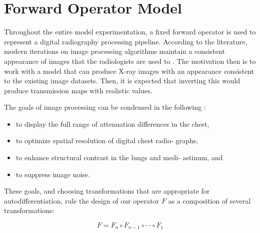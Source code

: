 \documentclass[nomenclature, english, bibtex]{kththesis}
\numberwithin{listing}{chapter}
\begin{document}
\section{Forward Operator Model}

Throughout the entire model experimentation, a fixed forward operator is used to represent a
digital radiography processing pipeline. According to the literature, modern iterations on image
processing algorithms maintain a consistent appearance of images that the radiologists are used to
\cite[p.~57]{STA00a}. The motivation then is to work with a model that can produce X-ray images
with an appearance consistent to the existing image datasets. Then, it is expected
that inverting this would produce transmission maps with realistic values.

The goals of image processing can be condensed in the following \cite[p.~149]{Prokop2003}:

\begin{itemize}
    \item to display the full range of attenuation differences in
    the chest,
    \item to optimize spatial resolution of digital chest radio-
    graphs,
    \item to enhance structural contrast in the lungs and medi-
    astinum, and
    \item to suppress image noise.
\end{itemize}

These goals, and choosing transformations that are appropriate for autodifferentiation, rule the design
of our operator $F$ as a composition of several transformations:

\begin{equation}
F = F_n \circ F_{n-1} \circ \cdots \circ F_1
\end{equation}
\end{document}
